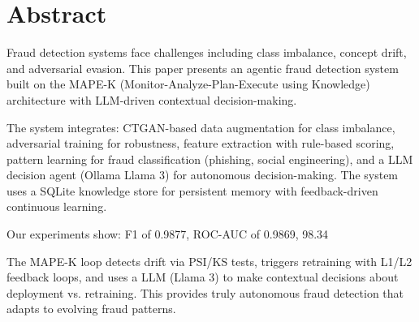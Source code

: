 \section{Abstract}

Fraud detection systems face challenges including class imbalance, concept drift, and adversarial evasion. This paper presents an agentic fraud detection system built on the MAPE-K (Monitor-Analyze-Plan-Execute using Knowledge) architecture with LLM-driven contextual decision-making.

The system integrates: CTGAN-based data augmentation for class imbalance, adversarial training for robustness, feature extraction with rule-based scoring, pattern learning for fraud classification (phishing, social engineering), and a LLM decision agent (Ollama Llama 3) for autonomous decision-making. The system uses a SQLite knowledge store for persistent memory with feedback-driven continuous learning.

Our experiments show: F1 of 0.9877, ROC-AUC of 0.9869, 98.34%

The MAPE-K loop detects drift via PSI/KS tests, triggers retraining with L1/L2 feedback loops, and uses a LLM (Llama 3) to make contextual decisions about deployment vs. retraining. This provides truly autonomous fraud detection that adapts to evolving fraud patterns.

